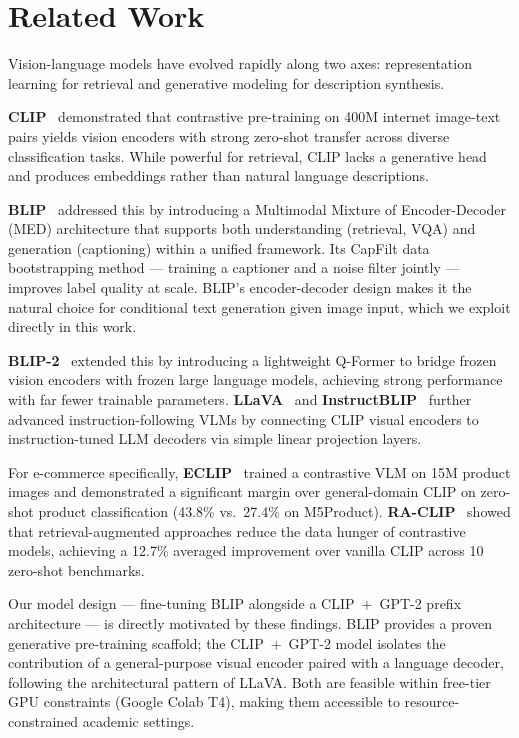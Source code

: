 \documentclass[12pt,a4paper]{article}
\begin{document}
\section{Related Work}

Vision-language models have evolved rapidly along two axes: representation learning
for retrieval and generative modeling for description synthesis.

\textbf{CLIP}~\cite{radford2021clip} demonstrated that contrastive pre-training on 400M
internet image-text pairs yields vision encoders with strong zero-shot transfer across
diverse classification tasks. While powerful for retrieval, CLIP lacks a generative head
and produces embeddings rather than natural language descriptions.

\textbf{BLIP}~\cite{li2022blip} addressed this by introducing a Multimodal Mixture of
Encoder-Decoder (MED) architecture that supports both understanding (retrieval, VQA)
and generation (captioning) within a unified framework. Its CapFilt data bootstrapping
method --- training a captioner and a noise filter jointly --- improves label quality
at scale. BLIP's encoder-decoder design makes it the natural choice for conditional
text generation given image input, which we exploit directly in this work.

\textbf{BLIP-2}~\cite{li2023blip2} extended this by introducing a lightweight Q-Former
to bridge frozen vision encoders with frozen large language models, achieving strong
performance with far fewer trainable parameters. \textbf{LLaVA}~\cite{liu2023llava} and
\textbf{InstructBLIP}~\cite{dai2023instructblip} further advanced instruction-following VLMs
by connecting CLIP visual encoders to instruction-tuned LLM decoders via simple linear
projection layers.

For e-commerce specifically, \textbf{ECLIP}~\cite{eclip2023} trained a contrastive VLM on
15M product images and demonstrated a significant margin over general-domain CLIP
on zero-shot product classification (43.8\% vs.\ 27.4\% on M5Product). \textbf{RA-CLIP}~\cite{raclip2023}
showed that retrieval-augmented approaches reduce the data hunger of contrastive models,
achieving a 12.7\% averaged improvement over vanilla CLIP across 10 zero-shot benchmarks.

Our model design --- fine-tuning BLIP alongside a CLIP~+~GPT-2 prefix architecture ---
is directly motivated by these findings. BLIP provides a proven generative pre-training
scaffold; the CLIP~+~GPT-2 model isolates the contribution of a general-purpose visual
encoder paired with a language decoder, following the architectural pattern of LLaVA.
Both are feasible within free-tier GPU constraints (Google Colab T4), making them
accessible to resource-constrained academic settings.
\end{document}

